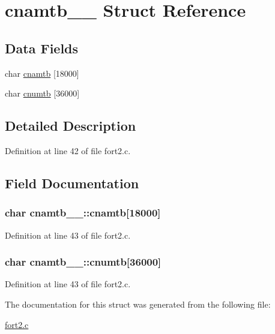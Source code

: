 \hypertarget{structcnamtb__1__}{}\section{cnamtb\+\_\+\_\+ Struct Reference}
\label{structcnamtb__1__}
\subsection*{Data Fields}
\begin{DoxyCompactItemize}
\item 
char \hyperlink{structcnamtb__1___adc69b5dade19449b9ac6536e6171830f}{cnamtb} \mbox{[}18000\mbox{]}
\item 
char \hyperlink{structcnamtb__1___a4f6d8644bc78f4190b8ebba26067e498}{cnumtb} \mbox{[}36000\mbox{]}
\end{DoxyCompactItemize}


\subsection{Detailed Description}


Definition at line 42 of file fort2.\+c.



\subsection{Field Documentation}
\subsubsection[{\texorpdfstring{cnamtb}{cnamtb}}]{\setlength{\rightskip}{0pt plus 5cm}char cnamtb\+\_\+\_\+\+::cnamtb\mbox{[}18000\mbox{]}}\hypertarget{structcnamtb__1___adc69b5dade19449b9ac6536e6171830f}{}\label{structcnamtb__1___adc69b5dade19449b9ac6536e6171830f}


Definition at line 43 of file fort2.\+c.

\subsubsection[{\texorpdfstring{cnumtb}{cnumtb}}]{\setlength{\rightskip}{0pt plus 5cm}char cnamtb\+\_\+\_\+\+::cnumtb\mbox{[}36000\mbox{]}}\hypertarget{structcnamtb__1___a4f6d8644bc78f4190b8ebba26067e498}{}\label{structcnamtb__1___a4f6d8644bc78f4190b8ebba26067e498}


Definition at line 43 of file fort2.\+c.



The documentation for this struct was generated from the following file\+:\begin{DoxyCompactItemize}
\item 
\hyperlink{fort2_8c}{fort2.\+c}\end{DoxyCompactItemize}
